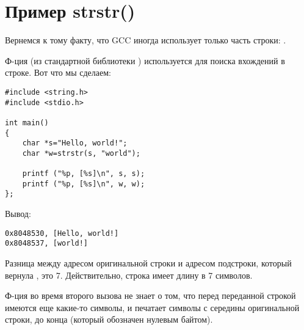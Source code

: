 \section{Пример strstr()}
\label{strstr_example}

Вернемся к тому факту, что GCC иногда использует только часть строки: .

Ф-ция  (из стандартной библиотеки \CCpp) используется для поиска вхождений в строке.
Вот что мы сделаем:

\begin{lstlisting}[style=customc]
#include <string.h>
#include <stdio.h>

int main()
{
	char *s="Hello, world!";
	char *w=strstr(s, "world");

	printf ("%p, [%s]\n", s, s);
	printf ("%p, [%s]\n", w, w);
};
\end{lstlisting}

Вывод:

\begin{lstlisting}
0x8048530, [Hello, world!]
0x8048537, [world!]
\end{lstlisting}

Разница между адресом оригинальной строки и адресом подстроки, который вернула , это 7.
Действительно, строка  имеет длину в 7 символов.

Ф-ция \printf{} во время второго вызова не знает о том, что перед переданной строкой имеются еще какие-то символы,
и печатает символы с середины оригинальной строки, до конца (который обозначен нулевым байтом).

